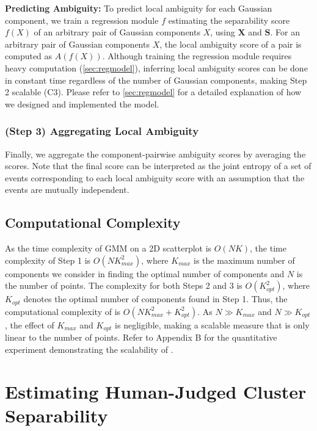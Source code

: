 \noindent
\textbf{Predicting Ambiguity:}
To predict local ambiguity for each Gaussian component, we train a regression module $f$ estimating the separability score $f(X)$ of an arbitrary pair of Gaussian components $X$, using $\mathbf{X}$ and $\mathbf{S}$. For an arbitrary pair of Gaussian components $X$, the local ambiguity score of a pair is computed as $A(f(X))$. 
Although 
training the regression module requires heavy computation (\autoref{sec:regmodel}), 
inferring local ambiguity scores can be done in constant time regardless of the number of Gaussian components, making Step 2 scalable (C3). 
Please refer to \autoref{sec:regmodel} for a detailed explanation of how we designed and implemented the model.

\subsubsection*{(Step 3) Aggregating Local Ambiguity}

Finally, we aggregate the component-pairwise ambiguity scores by averaging the scores.
Note that the final score can be interpreted as the joint entropy of a set of events corresponding to each local ambiguity score with an assumption that the events are mutually independent. 


\subsection{Computational Complexity}

As the time complexity of GMM on a 2D scatterplot is $O(NK)$, the time complexity of Step 1 is $O(NK_{max}^2)$, where $K_{max}$ is the maximum number of components we consider in finding the optimal number of components and $N$ is the number of points. The complexity for both Steps 2 and 3 is $O(K_{opt}^2)$, where $K_{opt}$ denotes the optimal number of components found in Step 1. Thus, the computational complexity of \measure is $O(NK_{max}^2 + K_{opt}^2)$. As $N \gg K_{max}$ and $N \gg K_{opt}$, the effect of $K_{max}$ and $K_{opt}$ is negligible, making \measure a scalable measure that is only linear to the number of points. Refer to Appendix B for the quantitative experiment demonstrating the scalability of \measure.


\section{Estimating Human-Judged Cluster Separability}

